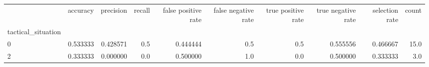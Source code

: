 \begin{tabular}{lrrrrrrrrr}
\toprule
{} &  accuracy &  precision &  recall &  false positive rate &  false negative rate &  true positive rate &  true negative rate &  selection rate &  count \\
tactical\_situation &           &            &         &                      &                      &                     &                     &                 &        \\
\midrule
0                  &  0.533333 &   0.428571 &     0.5 &             0.444444 &                  0.5 &                 0.5 &            0.555556 &        0.466667 &   15.0 \\
2                  &  0.333333 &   0.000000 &     0.0 &             0.500000 &                  1.0 &                 0.0 &            0.500000 &        0.333333 &    3.0 \\
\bottomrule
\end{tabular}
